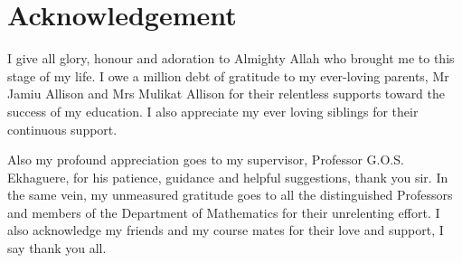 \documentclass[12pt]{report}
\numberwithin{equation}{section}
\begin{document}
\newpage 
{}
\section*{\centering Acknowledgement}


I give all glory, honour and adoration to Almighty Allah who brought me to this stage of my life. I owe a million debt of gratitude to my ever-loving parents, Mr Jamiu Allison and Mrs Mulikat Allison for their relentless supports toward the success of my education. I also appreciate my ever loving siblings for their continuous support.

Also my profound appreciation goes to my supervisor, Professor G.O.S. Ekhaguere, for his patience, guidance and helpful suggestions, thank you sir. In the same vein, my unmeasured gratitude goes to all the distinguished Professors and members of the Department of Mathematics for their unrelenting effort. I also acknowledge my friends and my course mates for their love and support, I say thank you all.





\newpage
{}
\end{document}
